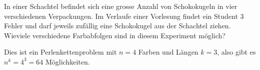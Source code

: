 In einer Schachtel befindet sich eine grosse Anzahl von Schokokugeln
in vier verschiedenen Verpackungen.
Im Verlaufe einer Vorlesung findet ein Student 3 Fehler und darf jeweils
zufällig eine Schokokugel aus der Schachtel ziehen.
Wieviele verschiedene Farbabfolgen sind in diesem Experiment möglich?

\begin{loesung}
Dies ist ein Perlenkettenproblem mit $n=4$ Farben und Längen $k=3$, also
gibt es $n^k=4^3 = 64$ Möglichkeiten.
\end{loesung}

